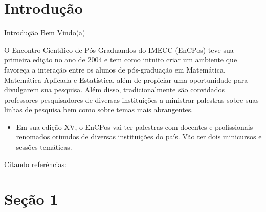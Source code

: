 \section{Introdução }
\begin{frame}{Introdução}  %
Bem Vindo(a)
 	
O Encontro Científico de Pós-Graduandos do IMECC (EnCPos) teve sua primeira edição no ano de 2004 e tem como intuito criar um ambiente que favoreça a interação entre os alunos de pós-graduação em Matemática, Matemática Aplicada e Estatística, além de propiciar uma oportunidade para divulgarem sua pesquisa. Além disso, tradicionalmente são convidados professores-pesquisadores de diversas instituições a ministrar palestras sobre suas linhas de pesquisa bem como sobre temas mais abrangentes.
  \begin{itemize}
    \item Em sua edição XV, o EnCPos vai ter palestras com docentes e profissionais renomados oriundos de diversas instituições do país. Vão ter dois minicursos e sessões temáticas.
  \end{itemize}
  Citando referências: \cite{albert2006stanley,alon2000number}
  
\end{frame}

\section{Seção 1}

